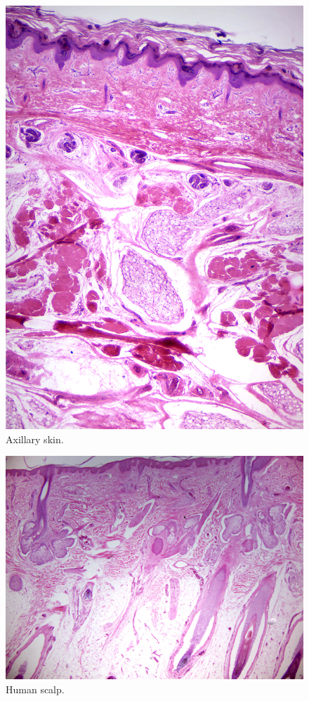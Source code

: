 \begin{figure}

{\centering \includegraphics[width=0.7\linewidth]{./figures/anatomy/axillary_skin}

}

\caption{Axillary skin.}\label{fig:axillary}
\end{figure}

\begin{figure}

{\centering \includegraphics[width=0.7\linewidth]{./figures/anatomy/human_scalp}

}

\caption{Human scalp.}\label{fig:scalp}
\end{figure}

